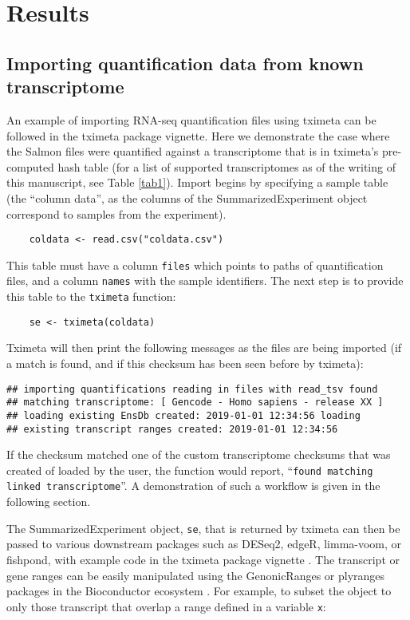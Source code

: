 \documentclass[12pt]{article} \usepackage[utf8]{inputenc}
\begin{document}
\section*{Results}

\subsection*{Importing quantification data from known transcriptome}

An example of importing RNA-seq quantification files using tximeta can
be followed in the tximeta package vignette. Here we demonstrate the
case where the Salmon files were quantified against a transcriptome
that is in tximeta's pre-computed hash table (for a list of supported
transcriptomes as of the writing of this manuscript, see Table
\ref{tab1}). Import begins by specifying a sample table (the ``column
data'', as the columns of the SummarizedExperiment object correspond
to samples from the experiment).

\begin{verbatim}
    coldata <- read.csv("coldata.csv")
\end{verbatim}

This table must have a column \texttt{files} which points to paths of
quantification files, and a column \texttt{names} with the sample
identifiers. The next step is to provide this table to the
\texttt{tximeta} function:

\begin{verbatim}
    se <- tximeta(coldata)
\end{verbatim}

Tximeta will then print the following messages as the files are being
imported (if a match is found, and if this checksum has been seen
before by tximeta):

\begin{verbatim}
## importing quantifications reading in files with read_tsv found
## matching transcriptome: [ Gencode - Homo sapiens - release XX ]
## loading existing EnsDb created: 2019-01-01 12:34:56 loading
## existing transcript ranges created: 2019-01-01 12:34:56
\end{verbatim}

If the checksum matched one of the custom transcriptome checksums that
was created of loaded by the user, the function would report,
``\texttt{found matching linked transcriptome}''. A demonstration of
such a workflow is given in the following section.

The SummarizedExperiment object, \texttt{se}, that is returned by
tximeta can then be passed to various downstream packages such as
DESeq2, edgeR, limma-voom, or fishpond, with example code in the
tximeta package vignette \citep{deseq2,edger,limma,voom,swish}. The
transcript or gene ranges can be easily manipulated using the
GenonicRanges or plyranges packages in the Bioconductor ecosystem
\citep{granges,Lee2019}. For example, to subset the object to only
those transcript that overlap a range defined in a variable
\texttt{x}:
\end{document}
